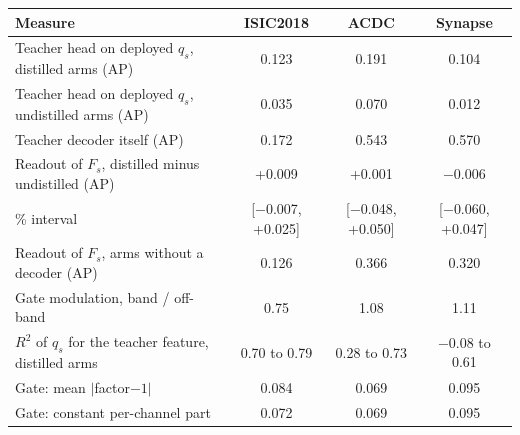 \begin{tabular}{lccc}
\toprule
Measure & ISIC2018 & ACDC & Synapse \\
\midrule
Teacher head on deployed $q_s$, distilled arms (AP) & 0.123 & 0.191 & 0.104 \\
Teacher head on deployed $q_s$, undistilled arms (AP) & 0.035 & 0.070 & 0.012 \\
Teacher decoder itself (AP) & 0.172 & 0.543 & 0.570 \\
Readout of $F_s$, distilled minus undistilled (AP) & +0.009 & +0.001 & $-$0.006 \\
\quad 95\% interval & [$-$0.007, +0.025] & [$-$0.048, +0.050] & [$-$0.060, +0.047] \\
Readout of $F_s$, arms without a decoder (AP) & 0.126 & 0.366 & 0.320 \\
Gate modulation, band / off-band & 0.75 & 1.08 & 1.11 \\
$R^2$ of $q_s$ for the teacher feature, distilled arms & 0.70 to 0.79 & 0.28 to 0.73 & $-$0.08 to 0.61 \\
Gate: mean $|$factor$-1|$ & 0.084 & 0.069 & 0.095 \\
Gate: constant per-channel part & 0.072 & 0.069 & 0.095 \\
\bottomrule
\end{tabular}
